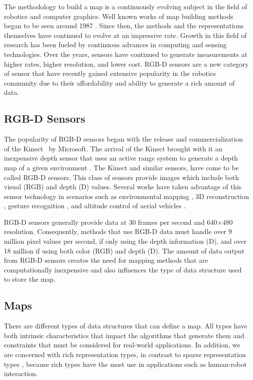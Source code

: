 The methodology to build a map is a continuously evolving subject in the field
of robotics and computer graphics. Well known works of map building methods
began to be seen around 1987 \cite{Lorensen1987}. Since then, the methods and
the representations themselves have continued to evolve at an impressive rate.
Growth in this field of research has been fueled by continuous advances in
computing and sensing technologies. Over the years, sensors have continued to
generate measurements at higher rates, higher resolution, and lower cost. RGB-D
sensors are a new category of sensor that have recently gained extensive
popularity in the robotics community due to their affordability and ability to
generate a rich amount of data.

\subsection{RGB-D Sensors}

The popularity of RGB-D sensors began with the release and commercialization of
the Kinect\texttrademark ~ by Microsoft. The arrival of the Kinect brought with
it an inexpensive depth sensor that uses an active range system to generate a
depth map of a given environment \cite{freedman2012depth}. The Kinect and
similar sensors, have come to be called RGB-D sensors. This class of sensors
provide images which include both visual (RGB) and depth (D) values. Several
works have taken advantage of this sensor technology in scenarios such as
environmental mapping \cite{henry2012rgb}, 3D reconstruction
\cite{Newcombe2011a}, gesture recognition \cite{Xia2011}, and altitude control
of aerial vehicles \cite{Stowers2011}.

RGB-D sensors generally provide data at 30 frames per second and 640$\times$480
resolution. Consequently, methods that use RGB-D data must handle over 9 million
pixel values per second, if only using the depth information (D), and over 18
million if using both color (RGB) and depth (D). The amount of
data output from RGB-D sensors creates the need for mapping methods that are
computationally inexpensive and also influences the type of data structure used
to store the map.

\subsection{Maps}

There are different types of data structures that can define a map. All types
have both intrinsic characteristics that impact the algorithms that generate
them and constraints that must be considered for real-world applications. In
addition, we are concerned with rich representation types, in contrast to sparse
representation types \cite{Dissanayake2001}, because rich types have the most
use in applications such as human-robot interaction.


